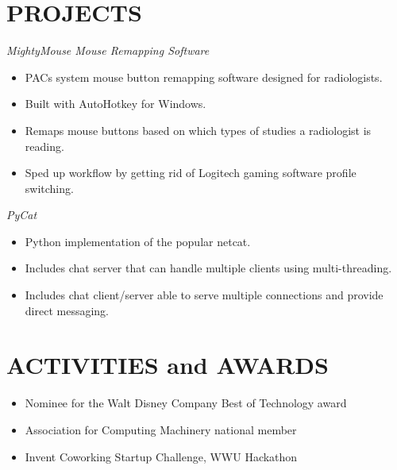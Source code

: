 \documentclass[line,margin]{res}
\begin{document}
\begin{resume}
	\section{PROJECTS}
		{\sl MightyMouse Mouse Remapping Software}
\begin{itemize}\itemsep -2pt
		\item PACs system mouse button remapping software designed for radiologists.
		\item Built with AutoHotkey for Windows.
		\item Remaps mouse buttons based on which types of studies a radiologist is reading.
		\item Sped up workflow by getting rid of Logitech gaming software profile switching.
	\end{itemize}
	{\sl PyCat}
	\begin{itemize}\itemsep -2pt
		\item Python implementation of the popular netcat.
		\item Includes chat server that can handle multiple clients using multi-threading.
		\item Includes chat client/server able to serve multiple connections and provide direct messaging.
	\end{itemize}



\section{ACTIVITIES and AWARDS}
	\begin{itemize} \itemsep -3pt
	\item Nominee for the Walt Disney Company Best of Technology award
	\item Association for Computing Machinery national member
	\item Invent Coworking Startup Challenge, WWU Hackathon
	\end{itemize}

\end{resume}
\end{document}

